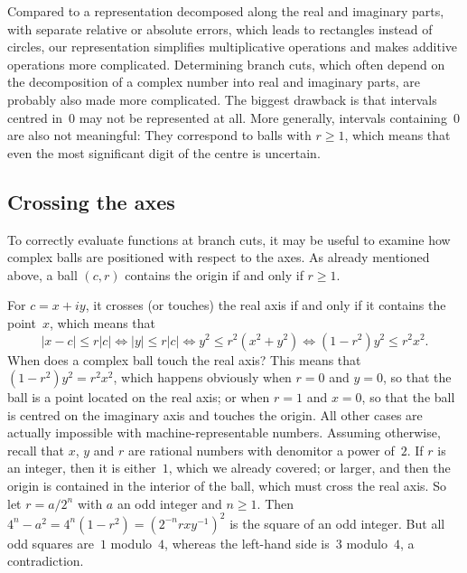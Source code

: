 \documentclass [11pt]{article}
\renewcommand {\leq}{\leqslant}
\renewcommand {\geq}{\geqslant}
\begin{document}
Compared to a representation decomposed along the real and imaginary parts,
with separate relative or absolute errors, which leads to rectangles
instead of circles, our representation simplifies multiplicative operations
and makes additive operations more complicated. Determining branch cuts,
which often depend on the decomposition of a complex number into real and
imaginary parts, are probably also made more complicated.
The biggest drawback is that intervals centred in~$0$ may not be
represented at all. More generally, intervals containing~$0$ are also
not meaningful: They correspond to balls with $r \geq 1$, which means that
even the most significant digit of the centre is uncertain.


\subsection {Crossing the axes}

\begin {center}
\end {center}

To correctly evaluate functions at branch cuts, it may be useful to examine
how complex balls are positioned with respect to the axes.
As already mentioned above, a ball $(c, r)$ contains the origin if and only
if $r \geq 1$.

For $c = x + i y$, it crosses (or touches) the real axis if and only if
it contains the point~$x$, which means that
\[
|x - c| \leq r |c|
\Leftrightarrow |y| \leq r |c|
\Leftrightarrow y^2 \leq r^2 \left( x^2 + y^2 \right)
\Leftrightarrow \left(1 - r^2 \right) y^2 \leq r^2 x^2.
\]
When does a complex ball touch the real axis?
This means that $(1 - r^2) y^2 = r^2 x^2$, which happens obviously when
$r = 0$ and $y = 0$, so that the ball is a point located on the real axis;
or when $r = 1$ and $x = 0$, so that the ball is centred on the imaginary
axis and touches the origin. All other cases are actually impossible with
machine-representable numbers. Assuming otherwise, recall that $x$, $y$
and $r$ are rational numbers with denomitor a power of~$2$.
If $r$ is an integer, then it is either~$1$, which we already covered;
or larger, and then the origin is contained in the interior of the ball,
which must cross the real axis.
So let $r = a / 2^n$ with $a$ an odd integer and $n \geq 1$. Then
$4^n - a^2 = 4^n (1 - r^2) = (2^{-n} r x y^{-1})^2$ is the square of an
odd integer. But all odd squares are~$1$ modulo~$4$, whereas the left-hand
side is~$3$ modulo~$4$, a contradiction.
\end{document}
